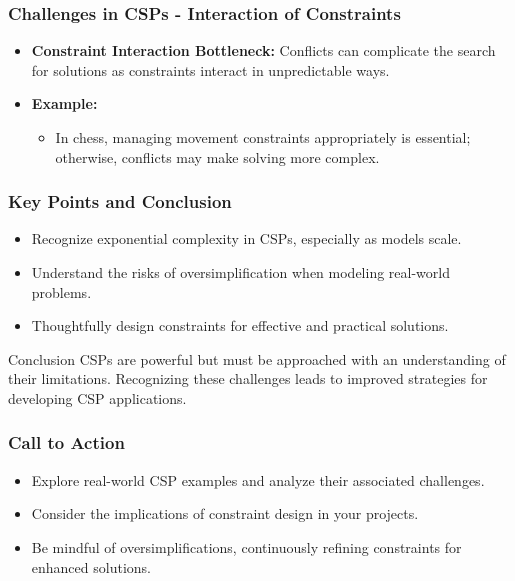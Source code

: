 \documentclass[aspectratio=169]{beamer}
\begin{document}
\begin{frame}[fragile]
    \frametitle{Challenges in CSPs - Interaction of Constraints}
    \begin{itemize}
        \item \textbf{Constraint Interaction Bottleneck:} Conflicts can complicate the search for solutions as constraints interact in unpredictable ways.
        \item \textbf{Example:} 
        \begin{itemize}
            \item In chess, managing movement constraints appropriately is essential; otherwise, conflicts may make solving more complex.
        \end{itemize}
    \end{itemize}
\end{frame}

\begin{frame}[fragile]
    \frametitle{Key Points and Conclusion}
    \begin{itemize}
        \item Recognize exponential complexity in CSPs, especially as models scale.
        \item Understand the risks of oversimplification when modeling real-world problems.
        \item Thoughtfully design constraints for effective and practical solutions.
    \end{itemize}
    \begin{block}{Conclusion}
        CSPs are powerful but must be approached with an understanding of their limitations. Recognizing these challenges leads to improved strategies for developing CSP applications.
    \end{block}
\end{frame}

\begin{frame}[fragile]
    \frametitle{Call to Action}
    \begin{itemize}
        \item Explore real-world CSP examples and analyze their associated challenges.
        \item Consider the implications of constraint design in your projects.
        \item Be mindful of oversimplifications, continuously refining constraints for enhanced solutions.
    \end{itemize}
\end{frame}
\end{document}
